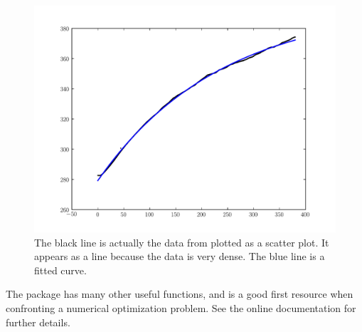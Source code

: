 \begin{figure}
\includegraphics[width=\textwidth]{HeatingFit.pdf}
\caption{The black line is actually the data from  plotted as a scatter plot. It appears as a line because the data is very dense. The blue line is a fitted curve.}
\label{opt:HeatingFit}
\end{figure}

The  package has many other useful functions, and is a good first resource when confronting a numerical optimization problem. See the online documentation for further details.


